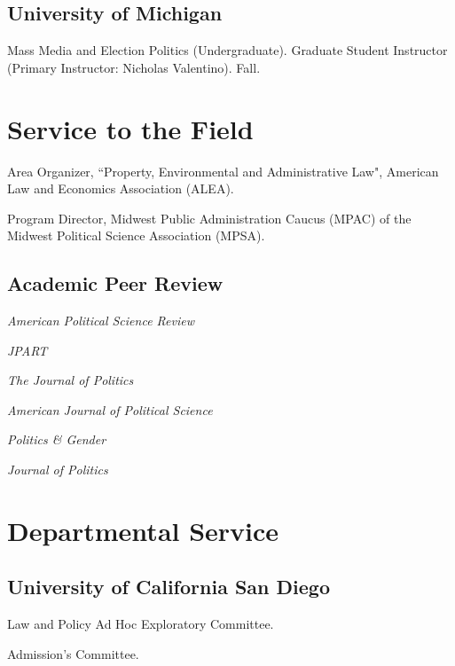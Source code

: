 \documentclass[12pt,letterpaper]{report}
\newcommand{\listitemspace}{0.25em}
\renewenvironment{itemize}
{\begin{list}{}{\setlength{\leftmargin}{0em}
                \setlength{\parskip}{0em}
                \setlength{\itemsep}{\listitemspace}
                \setlength{\parsep}{\listitemspace}}}
{\end{list}}
\newcommand{\tacourse}[5]{\item[#1] \tab{}#3 (#4). #5. #2.} %
\begin{document}
   \subsection*{University of Michigan}

   \begin{tablist}
    \tacourse{2013}{Fall}{Mass Media and Election Politics}{Undergraduate}{Graduate Student Instructor (Primary Instructor: Nicholas Valentino)}
    \end{tablist}
    
    
    \section*{Service to the Field}
	
	\begin{itemize}
        \item Area Organizer, ``Property, Environmental and Administrative Law", American Law and Economics Association (ALEA).
		\item Program Director, Midwest Public Administration Caucus (MPAC) of the Midwest Political Science Association (MPSA).
	\end{itemize}
	
    \subsection*{Academic Peer Review}
    
    \begin{itemize}
        \item[] \emph{American Political Science Review}
        \item[] \emph{JPART}
        \item[] \emph{The Journal of Politics}
        \item[] \emph{American Journal of Political Science}
        \item[] \emph{Politics \& Gender}
		\item[] \emph{Journal of Politics}
    \end{itemize}
	    
    \section*{Departmental Service}
    
    \subsection*{University of California San Diego}
    \begin{tablist}
        \item[2021-] \tab{}Law and Policy Ad Hoc Exploratory Committee.
        \item[2020-] \tab{}Admission's Committee.
    \end{tablist}
    
\end{document}
